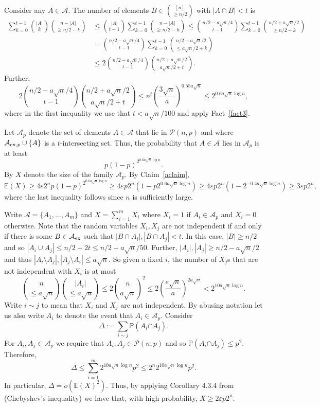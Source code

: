 \documentclass[11pt]{article}
\numberwithin{equation}{section}
\def\P{\mathcal{P}}
\def\eps{\varepsilon}
\begin{document}
Consider any $A \in \mathcal A$. The number of elements $B \in \binom{[n]}{\geq n/2}$ with $|A\cap B| < t$ is 
\begin{align}
\sum _{k=0} ^{t-1} \binom{|A|}{k} \binom{n-|A|}{\geq n/2-k} & \leq  \binom{|A|}{t-1} \sum _{k=0} ^{t-1}  \binom{n-|A|}{\geq n/2-k} 
 \leq  \binom{n/2-a\sqrt{n}/4}{t-1} \sum _{k=0} ^{t-1}  \binom{n/2+a\sqrt{n}/2}{\geq n/2-k} \nonumber  \\ & =  \binom{n/2-a\sqrt{n}/4}{t-1} \sum _{k=0} ^{t-1}  \binom{n/2+a\sqrt{n}/2}{\leq a\sqrt{n}/2+k} \nonumber
\\ & \leq 2 \binom{n/2-a\sqrt{n}/4}{t-1}  \binom{n/2+a\sqrt{n}/2}{ a\sqrt{n}/2+t}. \nonumber
\end{align} 
Further, 
$$ 2 \binom{n/2-a\sqrt{n}/4}{t-1}  \binom{n/2+a\sqrt{n}/2}{ a\sqrt{n}/2+t} \leq n^t \left(\frac{3\sqrt{n}}{a}\right)^{0.55a\sqrt{n}}\leq 2^{0.6a\sqrt{n}\log n},$$
where in the first inequality we use that $t < a\sqrt{n}/100$ and apply Fact~\ref{fact3}.

Let $\mathcal A_p$ denote the set of elements $A \in \mathcal A$ that lie in $\P(n,p)$ and where $\mathcal A_{{\rm ex},p}\cup \{A\}$ is a $t$-intersecting set.
Thus, the probability that $A\in \mathcal A$ lies in $\mathcal A_p$ is at least
$$p(1-p) ^{2^{0.6a\sqrt{n}\log n}}.$$
By $X$ denote the size of the family $\mathcal A_p$. 
By Claim~\ref{aclaim}, 
$$\mathbb E(X) \geq 4\eps  2^n p (1-p)^{2^{0.6a\sqrt{n}\log{n}}}\geq 4\eps p2^{n}(1-p2^{0.6a\sqrt{n}\log{n}})\geq 4\eps p2^{n}(1-2^{-0.4a\sqrt{n}\log{n}})\geq 3\eps p2^{n},$$ where the last inequality follows since $n$ is sufficiently large.

Write $\mathcal A=\{A_1,\dots, A_m\}$ and $X=\sum _{i=1} ^m X_i$ where $X_i=1$ if $A_i \in \mathcal A_p$ and $X_i=0$ otherwise. 
Note that the random variables $X_i,X_j$ are not independent if and only if there is some $B \in \mathcal A_{\rm ex}$ such that $|B \cap A_i|,|B\cap A_j|<t$. In this case, $|B|\geq n/2$ and so $|A_i \cup A_j|\leq n/2+2t \leq n/2 +a \sqrt{n}/50.$
Further, $|A_i|,|A_j| \geq n/2 -a\sqrt{n}/2$ and thus $|A_i \setminus A_j|, |A_j \setminus A_i|\leq a \sqrt{n}$. 
So given a fixed $i$, the number of $X_j$s that are not independent with $X_i$ is at most 
$$\binom{n}{\leq a \sqrt{n}}\binom{|A_i|}{\leq a \sqrt{n}}\leq 2 \binom{n}{ a \sqrt{n}}^2 \leq 2\left ( \frac{e \sqrt{n}}{a} \right )^ {2a \sqrt{n}} < 2^ {10 a \sqrt{n} \log n}.$$
Write $i \sim j$ to mean that $X_i$ and $X_j$ are not independent.
By abusing notation  let us also write $A_i$ to denote the event that $A_i \in \mathcal A_p$.
Consider
$$\Delta := \sum _{i \sim j} \mathbb P (A_i  \mathcal  \cap A_j) .$$
For $A_i,A_j \in \mathcal A_p$ we require that $A_i,A_j \in \mathcal P(n,p)$ and so   $\mathbb P (A_i  \mathcal  \cap A_j) \leq p^2.$
Therefore,
$$\Delta \leq \sum _{i=1} ^{m} 2^ {10 a \sqrt{n} \log n} p^2 \leq 2 ^{n} 2^ {10 a \sqrt{n} \log n} p^2.$$
In particular,   $\Delta =o(\mathbb E(X)^2)$. Thus, by applying Corollary 4.3.4 from~\cite{alon} (Chebyshev's inequality) we have that, with high probability, $X \geq 2\eps p2^{n}$.
\end{document}
